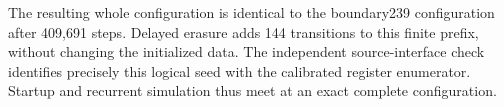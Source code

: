 The resulting whole configuration is identical to the boundary239
configuration after 409,691 steps. Delayed erasure adds 144 transitions
to this finite prefix, without changing the initialized data. The
independent source-interface check identifies precisely this logical
seed with the calibrated register enumerator. Startup and recurrent
simulation thus meet at an exact complete configuration.
